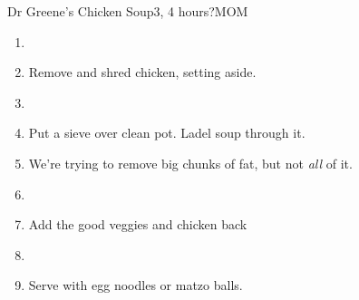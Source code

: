 \documentclass[]{mikescards}
\begin{document}
\begin{recipe}{Dr Greene's Chicken Soup}{3, 4 hours?}{MOM}
\begin{parcolumns}[colwidths={1=100pt}, rulebetween]{2}
{\begin{enumerate}
      \item 
      \item Remove and shred chicken, setting aside.
      \item 
      \item Put a sieve over clean pot. Ladel soup through it. 
      \item \hspace{5mm} We're trying to remove big chunks of fat, but not \textsl{all} of it.
      \item
      \item Add the good veggies and chicken back
      \item
      \item Serve with egg noodles or matzo balls.
    \end{enumerate}
  }
\end{parcolumns}

\end{recipe}
\end{document}
